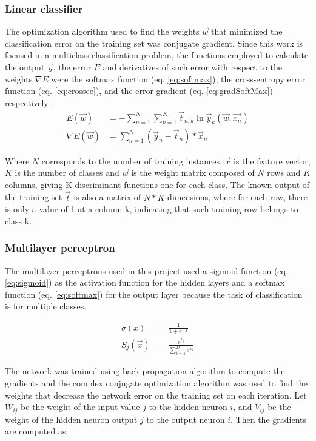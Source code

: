 \documentclass{article}
\begin{document}
\subsubsection{Linear classifier}
The optimization algorithm used to find the weights $\vec{w}$ that minimized the classification error on the training 
set was conjugate gradient.
Since this work is focused in a multiclass classification problem, the functions employed to calculate the output $\vec{y}$, the error $E$
and derivatives of such error with respect to the weights $\nabla E$ were the softmax function (eq. \ref{eq:softmax}), 
the cross-entropy error function (eq. \ref{eq:crossee}), and the error gradient (eq. \ref{eq:gradSoftMax}) respectively.
\begin{align}
E(\vec{w}) &= -\sum_{n=1}^{N}{\sum_{k=1}^{K}{\vec{t}_{n,k} \ln \vec{y}_{k}(\vec{w},\vec{x_{n}})}} \label{eq:crossee} \\
\nabla E(\vec{w}) &=  \sum_{n=1}^{N}{(\vec{y}_{n} - \vec{t}_{n})*\vec{x}_{n}} \label{eq:gradSoftMax}
\end{align}

Where $N$ corresponds to the number of training instances, $\vec{x}$ is the feature vector, $K$ is the number of classes
and $\vec{w}$ is the weight matrix composed of $N$ rows and $K$ columns, giving K discriminant functions one for
each class. The known output of the training set $\vec{t}$ is also a matrix of $N * K$ dimensions, where for each row, 
there is only a value of 1 at a column k, indicating that such training row belongs to class k.

\subsubsection{Multilayer perceptron}
The multilayer perceptrons used in this project used a sigmoid function (eq. \ref{eq:sigmoid}) as the
activation function for the hidden layers and a softmax function (eq. \ref{eq:softmax}) for the output layer
because the task of classification is for multiple classes.

\begin{align}
\sigma(x) &= \frac{1}{1+e^{-x}} \label{eq:sigmoid} \\ 
S_j(\vec{x}) &= \frac{e^{x_j}}{\sum_{i=1}^D{e^{x_i}}} \label{eq:softmax}
\end{align}

The network was trained using back propagation algorithm to compute the gradients and the complex conjugate
optimization algorithm was used to find the weights that decrease the network error on the training set on
each iteration. Let $W_{ij}$ be the weight of the input value $j$ to the hidden neuron $i$, and $V_{ij}$ be
the weight of the hidden neuron output $j$ to the output neuron $i$. Then the gradients are computed as:
\end{document}
